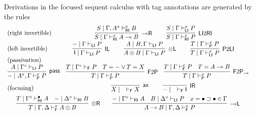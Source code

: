 \documentclass[submission,copyright,creativecommons]{eptcs}
\theoremstyle{definition}
\newtheorem{defn}{Definition}[section]
\newcommand{\tl}{\otimes \mathsf{L}}
\newcommand{\tr}{\otimes \mathsf{R}}
\newcommand{\lright}{{\multimap}\mathsf{R}}
\newcommand{\lleft}{{\multimap}\mathsf{L}}
\newcommand{\pass}{\mathsf{pass}}
\newcommand{\unitl}{\mathsf{IL}}
\newcommand{\unitr}{\mathsf{IR}}
\newcommand{\ax}{\mathsf{ax}}
\newcommand{\ot}{\otimes}
\newcommand{\lolli}{\multimap}
\newcommand{\I}{\mathsf{I}}
\newcommand{\RI}{\mathsf{RI}}
\newcommand{\LI}{\mathsf{LI}}
\newcommand{\Pass}{\mathsf{P}}
\newcommand{\F}{\mathsf{F}}
\newcommand{\xvdash}{\vdash^{x}}
\newcommand{\proofbox}[1]{\begin{tabular}{l} #1 \end{tabular}}
\newcommand{\NMILL}{\texttt{NMILL}}
\newcommand{\SkNMILL}{\NMILL\textsuperscript{\textit{s}}}
\newcommand{\FSkMCC}{\textsf{Free}}
\begin{document}
Derivations in the focused sequent calculus with tag annotations are generated by the rules
\begin{equation}\label{eq:focus}
  \begin{array}{lc}
    \text{(right invertible)} & %
    \proofbox{
      \infer[\lright]{S \mid \Gamma \vdash^{x}_{\RI} A \lolli B}{S \mid \Gamma , A^{x} \vdash^{x}_{\RI} B}
    \qquad
    \infer[\LI 2 \RI]{S \mid \Gamma \vdash^{x}_{\RI} P}{S \mid \Gamma \vdash^{x}_{\LI} P}
    }
    \\[6pt]
    \text{(left invertible)} & %
    \proofbox{
      \infer[\unitl]{\I \mid \Gamma \vdash_{\LI} P}{- \mid \Gamma \vdash_{\LI} P}
    \qquad
    \infer[\tl]{A \ot B \mid \Gamma \vdash_{\LI} P}{A \mid B , \Gamma \vdash_{\LI} P}
    \qquad
    \infer[\Pass 2 \LI]{T \mid \Gamma \xvdash_{\LI} P}{T \mid \Gamma \xvdash_{\Pass} P}
    }
    \\
    \text{(passivation)} & \\ %
   \multicolumn{2}{c}{
    \infer[\pass]{- \mid A^{x} , \Gamma \xvdash_{\Pass} P }{
      A\mid \Gamma^{\circ} \vdash_{\LI} P
    }
    \quad
%    
    \infer[\F 2 \Pass]{T \mid \Gamma \xvdash_{\Pass} P}{
      T \mid \Gamma^\circ \vdash_{\F} P &
      T = - \vee T = X
    }
    \quad
    \infer[\F 2 \Pass_{{\lolli}}]{T \mid \Gamma \xvdash_{\Pass} P}{
      T \mid \Gamma \xvdash_{\F} P &
      T = A \lolli B
    }
    }
    \\[6pt]
    \text{(focusing)} &    %
    \proofbox{\infer[\ax]{X \mid \quad \vdash_{\F} X}{}
    \qquad
    \infer[\unitr]{- \mid \quad \vdash_{\F} \I}{}
    }
    \\[6pt]
    \multicolumn{2}{c}{
    \infer[\tr]{T \mid \Gamma , \Delta \xvdash_{\F} A \ot B}{
      T \mid \Gamma^{\circ} \vdash^{\bullet}_{\RI} A
      &
      - \mid \Delta^{\circ} \vdash_{\RI} B
    }
    \qquad
    \infer[\lleft]{A \lolli B \mid \Gamma , \Delta \xvdash_{\F} P}{
      - \mid \Gamma^{\circ} \vdash_{\RI} A
      &
      B \mid \Delta^{\circ} \vdash_{\LI} P
      &
      x = \bullet \supset \bullet \in \Gamma
    }
    }
  \end{array}
\end{equation}
\end{document}
